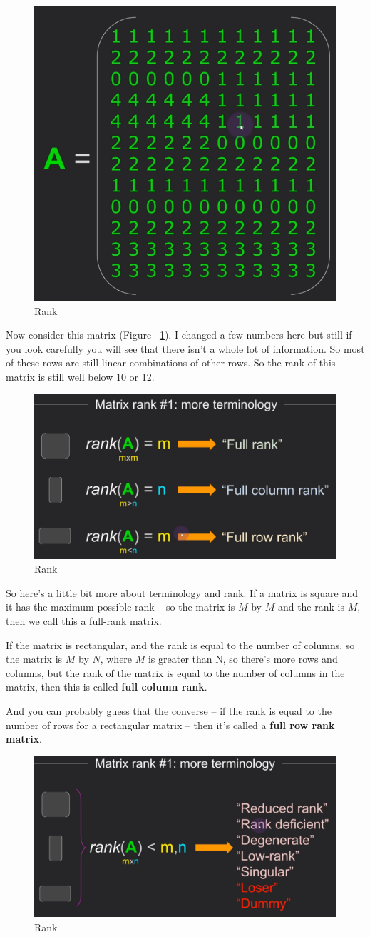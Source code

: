 \documentclass[fleqn,10pt]{olplainarticle}
\theoremstyle{definition}
\theoremstyle{remark}
\begin{document}
\begin{figure}[ht]
	\centering
	\includegraphics[width=0.25\linewidth]{images/rank-08.png}
	\caption{Rank}
	\label{fig:rank_08}
\end{figure}

Now consider this matrix (Figure ~\ref{fig:rank_08}). I changed a few numbers here but still if you look carefully you will see that there isn't a whole lot of information. So most of these rows are still linear combinations of other rows. So the rank of this matrix is still well below 10 or 12. 

\begin{figure}[ht]
	\centering
	\includegraphics[width=0.5\linewidth]{images/rank-09.png}
	\caption{Rank}
	\label{fig:rank_09}
\end{figure}

So here's a little bit more about terminology and rank. If a matrix is square and it has the maximum possible rank -- so the matrix is $M$ by $M$ and the rank is $M$, then we call this a full-rank matrix.

If the matrix is rectangular, and the rank is equal to the number of columns, so the matrix is $M$ by $N$, where $M$ is greater than N, so there's more rows and columns, but the rank of the matrix is equal to the number of columns in the matrix, then this is called \textbf{full column rank}.

And you can probably guess that the converse -- if the rank is equal to the number of rows for a rectangular matrix -- then it's called a \textbf{full row rank matrix}.

\begin{figure}[ht]
	\centering
	\includegraphics[width=0.5\linewidth]{images/rank-10.png}
	\caption{Rank}
	\label{fig:rank_10}
\end{figure}
\end{document}
